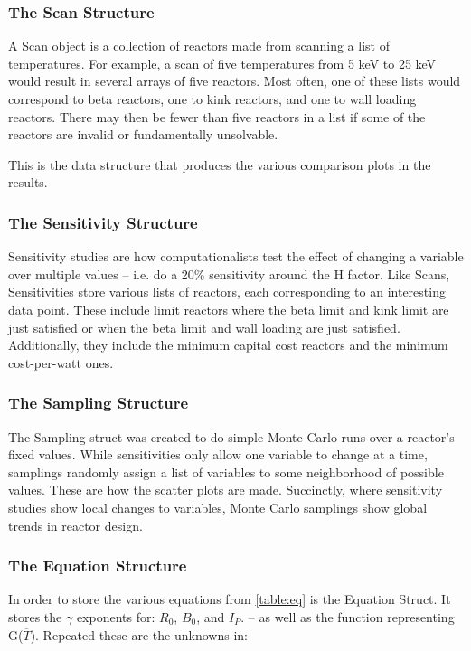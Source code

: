 \subsubsection{The Scan Structure}

A Scan object is a collection of reactors made from scanning a list of temperatures. For example, a scan of five temperatures from 5 keV to 25 keV would result in several arrays of five reactors. Most often, one of these lists would correspond to beta reactors, one to kink reactors, and one to wall loading reactors. There may then be fewer than five reactors in a list if some of the reactors are invalid or fundamentally unsolvable.

This is the data structure that produces the various comparison plots in the results.

\subsubsection{The Sensitivity Structure}

Sensitivity studies are how computationalists test the effect of changing a variable over multiple values -- i.e. do a 20\% sensitivity around the H factor. Like Scans, Sensitivities store various lists of reactors, each corresponding to an interesting data point. These include limit reactors where the beta limit and kink limit are just satisfied or when the beta limit and wall loading are just satisfied. Additionally, they include the minimum capital cost reactors and the minimum cost-per-watt ones. 

\subsubsection{The Sampling Structure}

The Sampling struct was created to do simple Monte Carlo runs over a reactor's fixed values. While sensitivities only allow one variable to change at a time, samplings randomly assign a list of variables to some neighborhood of possible values. These are how the scatter plots are made. Succinctly, where sensitivity studies show local changes to variables, Monte Carlo samplings show global trends in reactor design.

\subsubsection{The Equation Structure}

In order to store the various equations from \cref{table:eq} is the Equation Struct. It stores the $\gamma$ exponents for: $R_0$, $B_0$, and $I_P$. -- as well as the function representing G($\overline T$). Repeated these are the unknowns in:

